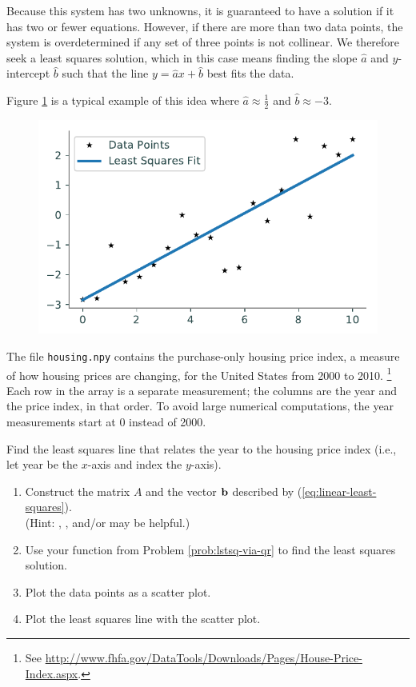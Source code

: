 Because this system has two unknowns, it is guaranteed to have a solution if it has two or fewer equations.
However, if there are more than two data points, the system is overdetermined if any set of three points is not collinear.
We therefore seek a least squares solution, which in this case means finding the slope $\widehat{a}$ and $y$-intercept $\widehat{b}$ such that the line $y = \widehat{a}x+\widehat{b}$ best fits the data.

Figure \ref{fig:line-fit-example} is a typical example of this idea where $\widehat{a} \approx \frac{1}{2}$ and $\widehat{b} \approx -3$.

\begin{figure}[H] %
    \includegraphics[width=.7\textwidth]{figures/line_fit_example.pdf}
    \caption{}
    \label{fig:line-fit-example}
\end{figure}

\begin{problem}
The file \texttt{housing.npy} contains the purchase-only housing price index, a measure of how housing prices are changing, for the United States from 2000 to 2010.%
\footnote{See \url{http://www.fhfa.gov/DataTools/Downloads/Pages/House-Price-Index.aspx}.}
Each row in the array is a separate measurement; the columns are the year and the price index, in that order.
To avoid large numerical computations, the year measurements start at 0 instead of 2000.

Find the least squares line that relates the year to the housing price index (i.e., let year be the $x$-axis and index the $y$-axis).

\begin{enumerate}
    \item Construct the matrix $A$ and the vector $\mathbf{b}$ described by (\ref{eq:linear-least-squares}).\\
    (Hint: , , and/or  may be helpful.)
    \item Use your function from Problem \ref{prob:lstsq-via-qr} to find the least squares solution.
    \item Plot the data points as a scatter plot.
    \item Plot the least squares line with the scatter plot.\\
\end{enumerate}
\end{problem}

